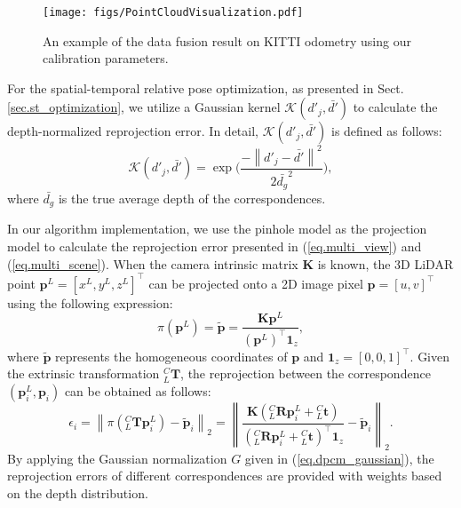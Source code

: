 \begin{figure*}[t!]
    \centering
    \texttt{[image: figs/PointCloudVisualization.pdf]}
    \caption{An example of the data fusion result on KITTI odometry using our calibration parameters.}
    \label{fig.exp_detail_datafusion_on_KITTI}
\end{figure*}

For the spatial-temporal relative pose optimization, as presented in Sect. \ref{sec.st_optimization}, we utilize a Gaussian kernel $\mathcal{K}(d'_{j},\bar{d'})$ to calculate the depth-normalized reprojection error. In detail, $\mathcal{K}(d'_{j},\bar{d'})$ is defined as follows:
\begin{equation}
\mathcal{K}(d'_{j},\bar{d'}) = \exp{ \bigg(\frac{ -\left\|{d'_{j}} - \bar{d'}\right\|^2 }{{2\bar{d_g}}^2} \bigg)},
\end{equation}
where $\bar{d_g}$ is the true average depth of the correspondences. 

In our algorithm implementation, we use the pinhole model as the projection model to calculate the reprojection error presented in (\ref{eq.multi_view}) and (\ref{eq.multi_scene}). When the camera intrinsic matrix $\boldsymbol{K}$ is known, the 3D LiDAR point $\boldsymbol{p}^{L}=[x^L,y^L,z^L]^\top$ can be projected onto a 2D image pixel $\boldsymbol{{p}} = [u,v]^\top$ using the following expression:
\begin{equation}
\pi(\boldsymbol{p}^{L}) = \tilde{\boldsymbol{p}} = \frac{\boldsymbol{K}\boldsymbol{p}^{L}}{(\boldsymbol{p}^{L})^\top\boldsymbol{1}_{z}},
\end{equation}
where $\tilde{\boldsymbol{p}}$ represents the homogeneous coordinates of $\boldsymbol{{p}}$ and $\boldsymbol{1}_{z}=[0,0,1]^\top$. Given the extrinsic transformation ${^C_L}\boldsymbol{T}$, the reprojection between the correspondence $(\boldsymbol{p}_{i}^L, \boldsymbol{p}_{i})$ can be obtained as follows:
\begin{equation}
\epsilon_i = \left\|\pi( {^C_L}\boldsymbol{T}\boldsymbol{p}_i^{L}) - \tilde{\boldsymbol{p}}_i  \right\|_2= \left\|\frac{\boldsymbol{K}({^{C}_{L}\boldsymbol{R}}\boldsymbol{p}_i^{L} + {^{C}_{L}\boldsymbol{t}})}{({^{C}_{L}\boldsymbol{R}}\boldsymbol{p}_i^{L} + {^{C}_{L}\boldsymbol{t}})^\top\boldsymbol{1}_{z}} - \tilde{\boldsymbol{p}}_i\right\|_2.
\end{equation}
By applying the Gaussian normalization $G$ given in (\ref{eq.dpcm_gaussian}), the reprojection errors of different correspondences are provided with weights based on the depth distribution.



